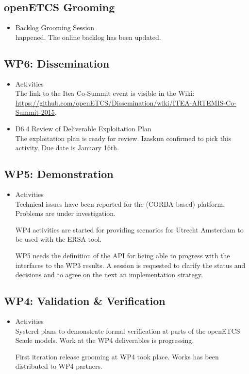\documentclass[a4paper, 11pt]{article}
\begin{document}
\subsection{openETCS Grooming}
\begin{itemize}
\item Backlog Grooming Session\\
happened. The online backlog has been updated.
\end{itemize}

\subsection{WP6: Dissemination}
\begin{itemize}
\item Activities\\
The link to the Itea Co-Summit event is visible in the Wiki:
\url{https://github.com/openETCS/Dissemination/wiki/ITEA-ARTEMIS-Co-Summit-2015}.\\

\item D6.4 Review of Deliverable Exploitation Plan\\
The exploitation plan is ready for review. Izaskun confirmed to pick this activity. Due date is January 16th.

\end{itemize}

\subsection{WP5: Demonstration}
\begin{itemize}
\item Activities\\
Technical issues have been reported for the (CORBA based) platform.  Problems are under investigation.

WP4 activities are started for providing scenarios for Utrecht Amsterdam to be used with the ERSA tool.

WP5 needs the definition of the API for being able to progress with the interfaces to the WP3 results. A session is requested to clarify the status and decisions and to agree on the next an implementation strategy.
\end{itemize}

\subsection{WP4: Validation \& Verification}
\begin{itemize}
\item Activities\\
Systerel plans to demonstrate formal verification at parts of the openETCS Scade models. Work at the WP4 deliverables is progressing. 

First iteration release grooming at WP4 took place. Works has been distributed to WP4 partners. 

\end{itemize}
\end{document}
